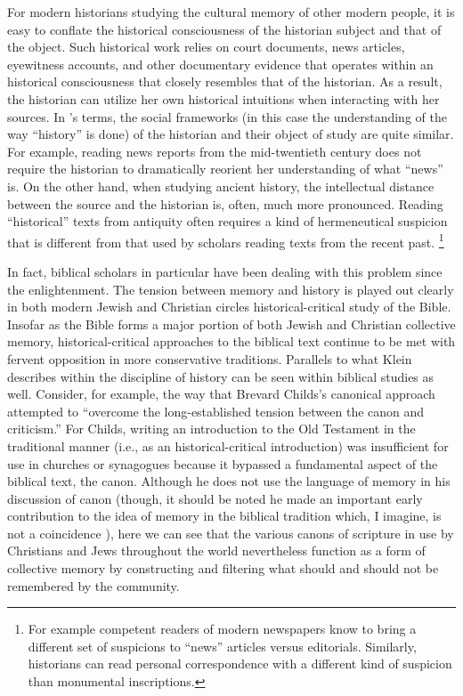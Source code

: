 For modern historians studying the cultural memory of other modern people, it is easy to conflate the historical consciousness of the historian subject and that of the object. Such historical work relies on court documents, news articles, eyewitness accounts, and other documentary evidence that operates within an historical consciousness that closely resembles that of the historian. As a result, the historian can utilize her own historical intuitions when interacting with her sources. In \halbwachs's terms, the social frameworks (in this case the understanding of the way ``history'' is done) of the historian and their object of study are quite similar. For example, reading news reports from the mid-twentieth century does not require the historian to dramatically reorient her understanding of what ``news'' is. On the other hand, when studying ancient history, the intellectual distance between the source and the historian is, often, much more pronounced. Reading ``historical'' texts from antiquity often requires a kind of hermeneutical suspicion that is different from that used by scholars reading texts from the recent past.%
    \footnote{%
        For example competent readers of modern newspapers know to bring a different set of suspicions to ``news'' articles versus editorials. Similarly, historians can read personal correspondence with a different kind of suspicion than monumental inscriptions.}

In fact, biblical scholars in particular have been dealing with this problem since the enlightenment. The tension between memory and history is played out clearly in both modern Jewish and Christian circles \visavis historical-critical study of the Bible. Insofar as the Bible forms a major portion of both Jewish and Christian collective memory, historical-critical approaches to the biblical text continue to be met with fervent opposition in more conservative traditions. Parallels to what Klein describes within the discipline of history can be seen within biblical studies as well. Consider, for example, the way that Brevard Childs's canonical approach attempted to ``overcome the long-established tension between the canon and criticism.''%
    \autocite[45]{childs1979}
For Childs, writing an introduction to the Old Testament in the traditional manner (i.e., as an historical-critical introduction) was insufficient for use in churches or synagogues because it bypassed a fundamental aspect of the biblical text, the canon. Although he does not use the language of memory in his discussion of canon (though, it should be noted he made an important early contribution to the idea of memory in the biblical tradition which, I imagine, is not a coincidence%
    \autocite{childs1962}%
), here we can see that the various canons of scripture in use by Christians and Jews throughout the world nevertheless function as a form of collective memory by constructing and filtering what should and should not be remembered by the community.  

